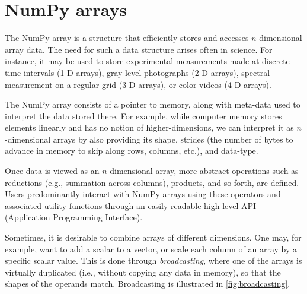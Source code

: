 
%
%
%
%
%
%

\section*{NumPy arrays}

The NumPy array is a structure that efficiently stores and accesses $n$-dimensional array data\cite{vanderwalt2011numpy}.  The need for such a data structure arises often in science.  For instance, it may be used to store experimental measurements made at discrete time intervals (1-D arrays), gray-level photographs (2-D arrays), spectral measurement on a regular grid (3-D arrays), or color videos (4-D arrays).

The NumPy array consists of a pointer to memory, along with meta-data used to interpret the data stored there.  For example, while computer memory stores elements linearly and has no notion of higher-dimensions, we can interpret it as $n$-dimensional arrays by also providing its shape, strides (the number of bytes to advance in memory to skip along rows, columns, etc.), and data-type.

Once data is viewed as an $n$-dimensional array, more abstract operations such as reductions (e.g., summation across columns), products, and so forth, are defined. Users predominantly interact with NumPy arrays using these operators and associated utility functions through an easily readable high-level API (Application Programming Interface).

Sometimes, it is desirable to combine arrays of different dimensions.  One may, for example, want to add a scalar to a vector, or scale each column of an array by a specific scalar value.  This is done through {\em broadcasting}, where one of the arrays is virtually duplicated (i.e., without copying any data in memory), so that the shapes of the operands match.  Broadcasting is illustrated in \ref{fig:broadcasting}.

